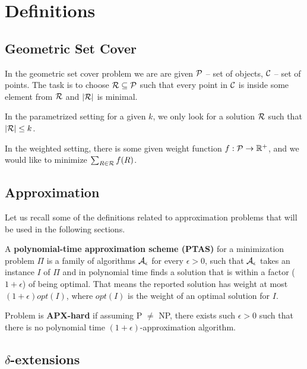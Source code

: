 \chapter{Definitions}

\section{Geometric Set Cover}

In the geometric set cover problem we are are given
$\mathcal{P}$ -- set of objects, $\mathcal{C}$ -- set of points.
The task is to choose $\mathcal{R} \subseteq \mathcal{P}$ such that
every point in $\mathcal{C}$ is inside some element from $\mathcal{R}$
and $|\mathcal{R}|$ is minimal.

In the parametrized setting for a given $k$,
we only look for a solution $\mathcal{R}$ such that $|\mathcal{R}| \le k$.


In the weighted setting, there is some given weight function
$f : \mathcal{P} \rightarrow \mathbb{R^+}$,
and we would like to minimize $\sum_{R \in \mathcal{R}} f(R)$.

\section{Approximation}

Let us recall some of the definitions related to approximation problems
that will be used in the following sections.

\begin{defi}
A \textbf{polynomial-time approximation scheme (PTAS)}
for a minimization problem $\Pi$
is a family of algorithms $\cal{A}_\epsilon$ for
every $\epsilon > 0$,
such that $\cal{A}_\epsilon$ takes an instance $I$ of $\Pi$
and in polynomial time
finds a solution that is within a factor
($1+\epsilon$) of being optimal.
That means the reported solution has weight at most
$(1+\epsilon)opt(I)$, where $opt(I)$ is the weight
of an optimal solution for $I$.
\end{defi}

\begin{defi}
Problem is \textbf{APX-hard} if assuming P $\neq$ NP,
there exists such $\epsilon > 0$
such that there is no polynomial time $(1+\epsilon)$-approximation algorithm.
\end{defi}

\section{$\delta$-extensions}

